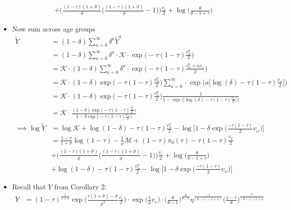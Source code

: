 \documentclass{article}
\newcommand{\M}{\mathcal{M}}
\begin{document}
\begin{itemize}
\begin{align*}
& + \Big( \frac{(1-\tau)(1+\hat\sigma)}{\hat \sigma}\Big(\frac{(1-\tau)(1+\hat\sigma)}{\hat \sigma} - 1 \Big)\Big) \frac{v_\varepsilon}{2} + \log\Bigg(  \frac{\theta}{\theta - 1 + \tau}\Bigg)
\end{align*}
\item Now sum across age groups
\begin{align*}
\tilde Y 
&= (1-\delta) \sum_{a = 0}^\infty \delta^a \tilde Y^a\\
&= (1-\delta) \sum_{a = 0}^\infty \delta^a \cdot \mathcal{K} \cdot \exp \Big(-\tau(1-\tau)\frac{v_\alpha^a}{2}\Big)\\
&= \mathcal{K} \cdot (1-\delta) \sum_{a = 0}^\infty \delta^a \cdot \exp \Big(-\tau(1-\tau)\frac{v_\alpha^0 +  av_\omega}{2}\Big)\\
&= \mathcal{K} \cdot (1-\delta) \exp \Big(-\tau(1-\tau)\frac{v_\alpha^0}{2}\Big) \sum_{a = 0}^\infty \cdot \exp \Big(a \Big[\log(\delta)-\tau(1-\tau)\frac{v_\omega}{2} \Big] \Big)\\
&= \mathcal{K} \cdot (1-\delta) \exp \Big(-\tau(1-\tau)\frac{v_\alpha^0}{2}\Big) \frac{1}{1-\exp \Big(\Big[\log(\delta)-\tau(1-\tau)\frac{v_\omega}{2} \Big] \Big)}\\
&= \mathcal{K} \cdot  \frac{(1-\delta) \exp \Big(-\tau(1-\tau)\frac{v_\alpha^0}{2}\Big)}{1-\delta\exp \Big(-\tau(1-\tau)\frac{v_\omega}{2} \Big)}\\
\implies
\log \tilde Y
&= \log \mathcal{K} + \log(1-\delta) - \tau(1-\tau)\frac{v_\alpha^0}{2} - \log\Big[ 1 - \delta \exp\Big( \frac{-\tau(1-\tau)}{2}v_\omega \Big) \Big]\\
&= \frac{1-\tau}{1+\sigma} \log(1-\tau) -\frac{1}{\hat\sigma} \M + (1-\tau)\pi_0(\tau) -\tau(1-\tau)\frac{v_\varphi}{2} \\
& + \Big( \frac{(1-\tau)(1+\hat\sigma)}{\hat \sigma}\Big(\frac{(1-\tau)(1+\hat\sigma)}{\hat \sigma} - 1 \Big)\Big) \frac{v_\varepsilon}{2} + \log\Bigg(  \frac{\theta}{\theta - 1 + \tau}\Bigg) \\&+ \log(1-\delta) - \tau(1-\tau)\frac{v_\alpha^0}{2} - \log\Big[ 1 - \delta \exp\Big( \frac{-\tau(1-\tau)}{2}v_\omega \Big) \Big]
\end{align*}
\item Recall that $Y$ from Corollary 2:
\begin{align*}
Y &= (1-\tau)^{\frac{1}{1+\sigma}} \exp\Bigg( \frac{\tau(1+\hat\sigma) - \hat \sigma}{\hat \sigma^2}\frac{v_\varepsilon}{2}\Bigg)\cdot \exp\Bigg(\frac{1}{\hat\sigma} v_\varepsilon\Bigg)\cdot \Bigg(\frac{\theta}{\theta-1}\Bigg)^{\frac{\theta}{\theta-1}} \eta^{\frac{-1}{(\theta-1)(1+\psi)}} \Bigg( \frac{1-\tau}{\theta}\Bigg)^{\frac{\psi}{(\theta-1)(1+\psi}} \\ 

\end{align*}
\end{itemize}
\end{document}
